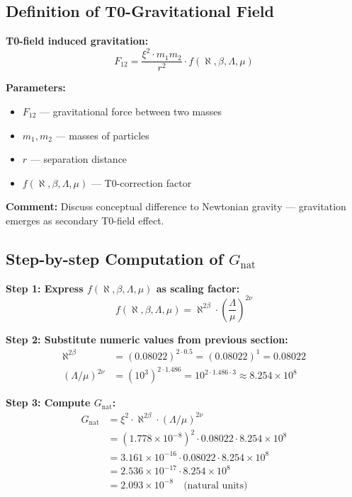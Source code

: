 \documentclass[12pt,a4paper]{article}
\newcommand{\xipar}{\xi}            %
\newcommand{\nulep}{\nu}            %
\begin{document}
\subsection{Definition of T0-Gravitational Field}

\textbf{T0-field induced gravitation:}
\begin{equation}
	F_{12} = \frac{\xipar^2 \cdot m_1 m_2}{r^2} \cdot f(\aleph, \beta, \Lambda, \mu)
\end{equation}

\textbf{Parameters:}
\begin{itemize}
	\item $F_{12}$ — gravitational force between two masses
	\item $m_1, m_2$ — masses of particles
	\item $r$ — separation distance
	\item $f(\aleph, \beta, \Lambda, \mu)$ — T0-correction factor
\end{itemize}

\textbf{Comment:} Discuss conceptual difference to Newtonian gravity — gravitation emerges as secondary T0-field effect.

\subsection{Step-by-step Computation of $G_{\text{nat}}$}

\textbf{Step 1: Express $f(\aleph, \beta, \Lambda, \mu)$ as scaling factor:}
\begin{equation}
	f(\aleph, \beta, \Lambda, \mu) = \aleph^{2\beta} \cdot \left( \frac{\Lambda}{\mu} \right)^{2\nulep}
\end{equation}

\textbf{Step 2: Substitute numeric values from previous section:}
\begin{align}
	\aleph^{2\beta} &= (0.08022)^{2 \cdot 0.5} = (0.08022)^1 = 0.08022 \\
	(\Lambda/\mu)^{2\nulep} &= (10^3)^{2 \cdot 1.486} = 10^{2 \cdot 1.486 \cdot 3} \approx 8.254 \times 10^8
\end{align}

\textbf{Step 3: Compute $G_{\text{nat}}$:}
\begin{align}
	G_{\text{nat}} &= \xipar^2 \cdot \aleph^{2\beta} \cdot (\Lambda/\mu)^{2\nulep} \\
	&= (1.778 \times 10^{-8})^2 \cdot 0.08022 \cdot 8.254 \times 10^8 \\
	&= 3.161 \times 10^{-16} \cdot 0.08022 \cdot 8.254 \times 10^8 \\
	&= 2.536 \times 10^{-17} \cdot 8.254 \times 10^8 \\
	&= 2.093 \times 10^{-8} \quad \text{(natural units)}
\end{align}
\end{document}
